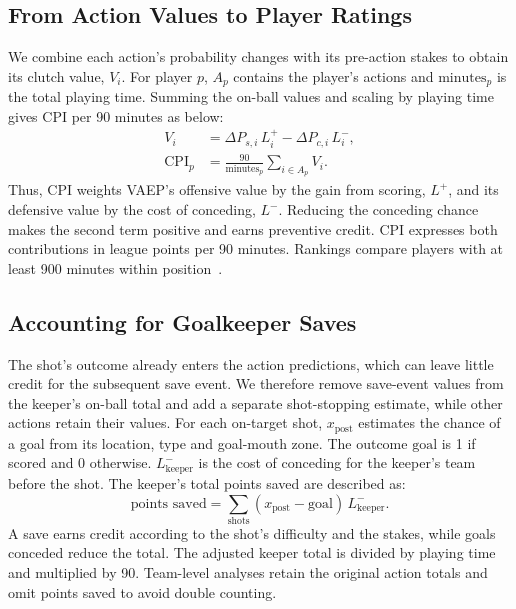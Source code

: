 \documentclass[runningheads]{llncs}
\newcommand{\Lp}{L^{+}}
\newcommand{\Lm}{L^{-}}
\begin{document}
\subsection{From Action Values to Player Ratings}
We combine each action's probability changes with its pre-action stakes to obtain its clutch value, $V_i$. For player $p$, $A_p$ contains the player's actions and $\text{minutes}_p$ is the total playing time. Summing the on-ball values and scaling by playing time gives CPI per 90 minutes as below:
\begin{equation}
\begin{aligned}
V_i&=\Delta P_{s,i}\,\Lp_i-\Delta P_{c,i}\,\Lm_i,\\
\mathrm{CPI}_p&=\frac{90}{\text{minutes}_p}\sum_{i\in A_p}V_i.
\end{aligned}
\end{equation}
Thus, CPI weights VAEP's offensive value by the gain from scoring, $\Lp$, and its defensive value by the cost of conceding, $\Lm$. Reducing the conceding chance makes the second term positive and earns preventive credit. CPI expresses both contributions in league points per 90 minutes. Rankings compare \nQualified{} players with at least 900 minutes within position~\cite{bransen2019}.

\subsection{Accounting for Goalkeeper Saves}
The shot's outcome already enters the action predictions, which can leave little credit for the subsequent save event. We therefore remove save-event values from the keeper's on-ball total and add a separate shot-stopping estimate, while other actions retain their values. For each on-target shot, $x_{\text{post}}$ estimates the chance of a goal from its location, type and goal-mouth zone. The outcome $\text{goal}$ is 1 if scored and 0 otherwise. $\Lm_{\text{keeper}}$ is the cost of conceding for the keeper's team before the shot. The keeper's total points saved are described as:
\begin{equation}
\text{points saved}=\textstyle\sum_{\text{shots}}(x_{\text{post}}-\text{goal})\,\Lm_{\text{keeper}}.
\end{equation}
A save earns credit according to the shot's difficulty and the stakes, while goals conceded reduce the total. The adjusted keeper total is divided by playing time and multiplied by 90. Team-level analyses retain the original action totals and omit points saved to avoid double counting.
\end{document}
